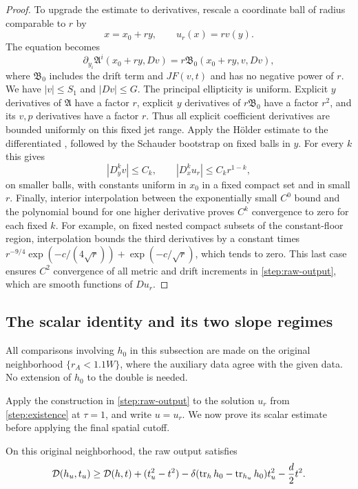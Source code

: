\begin{proof}
To upgrade the estimate to derivatives, rescale a coordinate ball of
radius comparable to $r$ by
\[
 x=x_0+ry,\qquad u_r(x)=r v(y).
\]
The equation becomes
\begin{equation}\label{step:rescaled}
 \partial_{y_i}\mathfrak A^i(x_0+ry,Dv)
 =r\mathfrak B_0(x_0+ry,v,Dv),
\end{equation}
where $\mathfrak B_0$ includes the drift term and $JF(v,t)$ and has no
negative power of $r$.  We have $|v|\le S_1$ and $|Dv|\le G$.
The principal ellipticity is uniform.  Explicit $y$ derivatives of
$\mathfrak A$ have a factor $r$, explicit $y$ derivatives of
$r\mathfrak B_0$ have a factor $r^2$, and its $v,p$ derivatives have a
factor $r$.  Thus all explicit coefficient derivatives are bounded
uniformly on this fixed jet range. Apply the H\"older estimate to the
differentiated , followed by the
Schauder bootstrap on fixed balls in $y$. For every $k$ this gives
\[
 |D_y^kv|\le C_k,\qquad |D_x^ku_r|\le C_kr^{1-k},
\]
on smaller balls, with constants uniform in $x_0$ in a fixed compact
set and in small $r$.  Finally, interior interpolation between the
exponentially small $C^0$ bound and the polynomial bound for one higher
derivative proves $C^k$ convergence to zero for each fixed $k$.
For example, on fixed nested compact subsets of the constant-floor region,
interpolation bounds the third derivatives by a constant times
$r^{-9/4}\exp(-c/(4\sqrt r))+\exp(-c/\sqrt r)$, which tends to zero.  This
last case ensures $C^2$ convergence of all metric and drift increments
in \cref{step:raw-output}, which are smooth functions of $Du_r$.
\end{proof}

\subsection{The scalar identity and its two slope regimes}

All comparisons involving $h_0$ in this subsection are made on the
original neighborhood $\{r_A<1.1W\}$, where the auxiliary data agree
with the given data.  No extension of $h_0$ to the double is needed.

Apply the construction in \cref{step:raw-output} to the solution $u_r$
from \cref{step:existence} at $\tau=1$, and write $u=u_r$. We now prove
its scalar estimate before applying the final spatial cutoff.

\begin{lemma}\label{step:raw-estimate}
On this original neighborhood, the raw output satisfies
\begin{equation}\label{step:raw-inequality}
 \mathcal D(h_u,t_u)\ge\mathcal D(h,t)+(t_u^2-t^2)
 -\delta(\operatorname{tr}_hh_0-\operatorname{tr}_{h_u}h_0)t_u^2-\frac d2t^2.
\end{equation}
\end{lemma}

